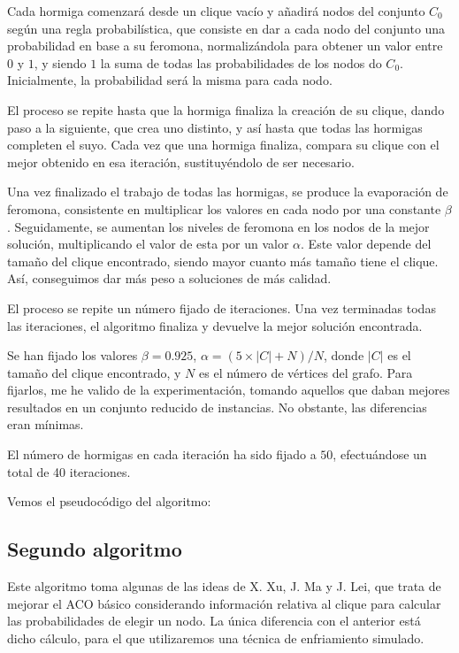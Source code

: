 Cada hormiga comenzará desde un clique vacío y añadirá nodos del conjunto $C_0$ según una regla probabilística,
que consiste en dar a cada nodo del conjunto una probabilidad en base a su feromona, normalizándola para obtener
un valor entre $0$ y $1$, y siendo $1$ la suma de todas las probabilidades de los nodos do $C_0$. Inicialmente,
la probabilidad será la misma para cada nodo.

El proceso se repite hasta que la hormiga finaliza la creación de su clique, dando paso a la siguiente, que crea
uno distinto, y así hasta que todas las hormigas completen el suyo. Cada vez que una hormiga finaliza, compara
su clique con el mejor obtenido en esa iteración, sustituyéndolo de ser necesario.

Una vez finalizado el trabajo de todas las hormigas, se produce la evaporación de feromona, consistente en
multiplicar los valores en cada nodo por una constante $\beta$. Seguidamente, se aumentan los niveles de feromona
en los nodos de la mejor solución, multiplicando el valor de esta por un valor $\alpha$. Este valor depende
del tamaño del clique encontrado, siendo mayor cuanto más tamaño tiene el clique. Así, conseguimos dar más
peso a soluciones de más calidad.

El proceso se repite un número fijado de iteraciones. Una vez terminadas todas las iteraciones, el algoritmo
finaliza y devuelve la mejor solución encontrada.

Se han fijado los valores $\beta = 0.925$, $\alpha = (5 \times |C| + N) / N$, donde $|C|$ es el tamaño del clique
encontrado, y $N$ es el número de vértices del grafo. Para fijarlos, me he valido de la experimentación,
tomando aquellos que daban mejores resultados en un conjunto reducido de instancias. No obstante, las diferencias
eran mínimas.

El número de hormigas en cada iteración ha sido fijado a $50$, efectuándose un total de 40 iteraciones.

Vemos el pseudocódigo del algoritmo: 

\subsection{Segundo algoritmo}

Este algoritmo toma algunas de las ideas de X. Xu, J. Ma y J. Lei, que trata de mejorar el ACO básico considerando
información relativa al clique para calcular las probabilidades de elegir un nodo. La única diferencia con el anterior
está dicho cálculo, para el que utilizaremos una técnica de enfriamiento simulado.

